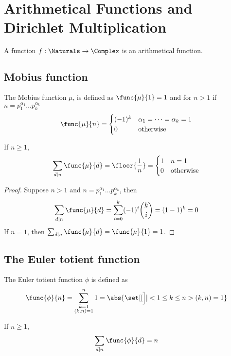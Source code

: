 \chapter{Arithmetical Functions and Dirichlet Multiplication}
\begin{definition}
    A function \(f: \Naturals \to \Complex\) is an arithmetical function.
\end{definition}
\section{Mobius function}
The Mobius function \(\mu\), is defined as \(\func{\mu}{1} = 1\) and for \(n > 1\) if \(n = p_1^{\alpha_1} \dots p_k^{\alpha_k}\)
\begin{equation*}
    \func{\mu}{n} = \begin{cases}
        (-1)^k & \alpha_1 = \dots = \alpha_k = 1\\
        0 & \mathrm{otherwise}
    \end{cases}
\end{equation*}
\begin{theorem}
    If \(n\geq 1\), 
    \begin{equation*}
        \sum_{d \mid n} \func{\mu}{d} = \floor{\frac{1}{n}} = \begin{cases}
            1 & n = 1\\
            0 & \mathrm{otherwise}
        \end{cases}
    \end{equation*}
\end{theorem}
\begin{proof}
    Suppose \(n > 1\) and \(n = p_1^{\alpha_1} \dots p_k^{\alpha_k}\), then 
    \begin{equation*}
        \sum_{d \mid n} \func{\mu}{d} = \sum_{i = 0}^k (-1)^i\binom{k}{i} = (1 - 1)^{k} = 0
    \end{equation*}
    If \(n = 1\), then \(\sum_{d \mid n} \func{\mu}{d} = \func{\mu}{1} = 1\).
\end{proof}
\section{The Euler totient function}
The Euler totient function \(\phi\) is defined as 
\begin{equation*}
    \func{\phi}{n} = \sum_{\substack{k  = 1 \\ (k,n) = 1}}^n 1 = \abs{\set[[\Big]]<1 \leq k \leq n>{(k,n) = 1}}
\end{equation*}
\begin{theorem}
    If \(n \geq 1\), 
    \begin{equation*}
        \sum_{d \mid n} \func{\phi}{d} = n 
    \end{equation*}
\end{theorem}

